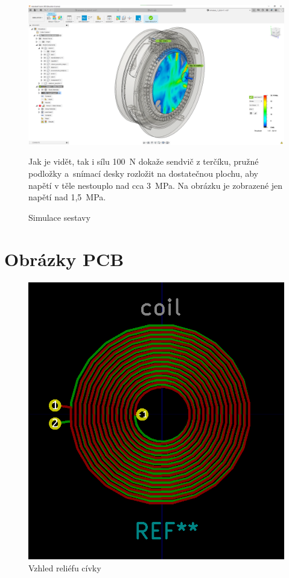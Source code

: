 \begin{figure}[htbp]
    \centering
    \includegraphics[width=\textwidth]{kapitoly/obrazky/E4/machanika_tlakove_desky/simulace/zjednodusena_sestava_pri_F100N_nezobrazeno_napeti_pod_1,5MPa.png}
    \caption{Simulace sestavy}
    Jak je vidět, tak i sílu 100~N dokaže sendvič z terčíku, pružné podložky a~snímací desky rozložit na dostatečnou plochu, aby napětí v těle nestouplo 
    nad cca 3~MPa. Na obrázku je zobrazené jen napětí nad 1,5~MPa.
    \label{fig:E4-simulace_tlakovky}
\end{figure}

\section*{Obrázky PCB}

\begin{figure}[htbp]
    \centering
    \includegraphics[width=\textwidth]{kapitoly/obrazky/E4/elektronika_tlakove_desky/civka.png}
    \caption{Vzhled reliéfu cívky}
    \label{fig:E4-relief_civka}
\end{figure}

